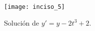\begin{figure}[!hbt]
\centering
  \texttt{[image: inciso\_5]}
	\caption{Solución de $y'=y-2t^3+2$.}%
	\label{fig:i5}
\end{figure}
